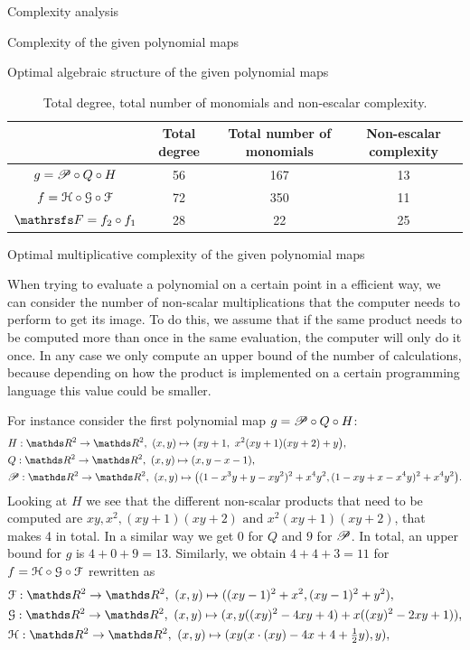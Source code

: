 \documentclass[11pt, a4paper, english, twoside, notitlepage, openright]{report}
\begin{document}
\begin{chapter}{Complexity analysis}
\begin{section}{Complexity of the given polynomial maps}
\begin{subsection}{Optimal algebraic structure of the given polynomial maps}
\begin{table}[t]
\begin{center}
\begin{tabular}{c || c | c | c}
& Total degree & Total number of monomials & Non-escalar complexity\\ \hline \hline
$g = \P\circ Q \circ H$ & 56 & 167 & 13 \\ \hline
$f=\HH\circ\GG\circ\FF$ & 72 &  350 & 11\\ \hline
$\FFF = f_2 \circ f_1$ & 28 & 22 & 25\\	
\end{tabular}
\caption{Total degree, total number of monomials and non-escalar complexity.}\label{tab:degreeMon}
\end{center}
\end{table}

\end{subsection}

\begin{subsection}{Optimal multiplicative complexity of the given polynomial maps}

When trying to evaluate a polynomial on a certain point in a efficient way, we can consider the number of non-scalar multiplications that the computer needs to perform to get its image. To do this, we assume that if the same product needs to be computed more than once in the same evaluation, the computer will only do it once. In any case we only compute an upper bound of the number of calculations, because depending on how the product is implemented on a certain programming language this value could be smaller.

For instance consider the first polynomial map $g = \P\circ Q \circ H$:
\begin{align*}
&H:\R^2\to\R^2,\ (x,y)\mapsto\big(xy+1,\ x^2(xy+1)(xy+2)+y\big), \\
&Q:\R^2\to\R^2,\ (x,y)\mapsto(x,y-x-1), \\
&\P:\R^2\to\R^2,\ (x,y)\mapsto\big((1-x^3y+y-xy^2)^2+x^4y^2, (1-xy+x-x^4y)^2+x^4y^2\big).\\
\end{align*}
Looking at $H$ we see that the different non-scalar products that need to be computed are $xy, x^2, (xy + 1)(xy+2) \text{ and } x^2(xy + 1)(xy+2)$, that makes 4 in total. In a similar way we get 0 for $Q$ and $9$ for $\P$. In total, an upper bound for $g$ is $4 + 0 + 9 = 13$. Similarly, we obtain $4+4+3=11$ for $f=\HH\circ\GG\circ\FF$ rewritten as
\begin{align*}
&\FF:\R^2\to\R^2,\  (x,y)\mapsto((xy-1)^2+x^2,(xy-1)^2+y^2),\\
&\GG:\R^2\to\R^2,\  (x,y)\mapsto(x,y((xy)^2-4xy+4)+x((xy)^2-2xy+1)),\\
&\HH:\R^2\to\R^2,\  (x,y)\mapsto(xy(x\cdot(xy)-4x+4+\tfrac{1}{2}y),y),
\end{align*}


\end{subsection}
\end{section}
\end{chapter}
\end{document}
